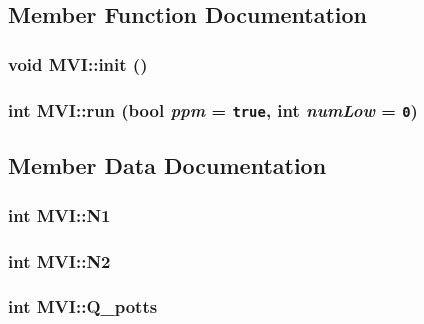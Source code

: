 \subsection{Member Function Documentation}
\subsubsection{\setlength{\rightskip}{0pt plus 5cm}void MVI::init ()}\label{classMVI_fbf8f75717db65cc9f8e0d7ce51e2534}


\subsubsection{\setlength{\rightskip}{0pt plus 5cm}int MVI::run (bool {\em ppm} = {\tt true}, int {\em numLow} = {\tt 0})}\label{classMVI_dcd50473c7f80b742cd7001dcb85e89b}




\subsection{Member Data Documentation}
\subsubsection{\setlength{\rightskip}{0pt plus 5cm}int {\bf MVI::N1}\hspace{0.3cm}{\tt  [private]}}\label{classMVI_fc91264ae571653d735c76761a3f00ef}


\subsubsection{\setlength{\rightskip}{0pt plus 5cm}int {\bf MVI::N2}\hspace{0.3cm}{\tt  [private]}}\label{classMVI_7d978b290f957a8de231ab3876b564c1}


\subsubsection{\setlength{\rightskip}{0pt plus 5cm}int {\bf MVI::Q\_\-potts}\hspace{0.3cm}{\tt  [private]}}\label{classMVI_fc77b5ea4a4e4e911f9e75da72219dd2}


